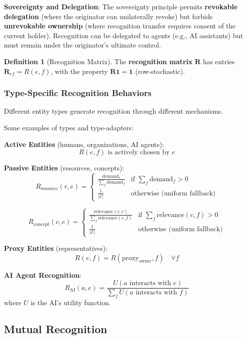 \documentclass[11pt,a4paper]{article}
\theoremstyle{definition}
\newtheorem{definition}[theorem]{Definition}
\theoremstyle{remark}
\newcommand{\E}{\mathcal{E}}
\begin{document}
\textbf{Sovereignty and Delegation}: The sovereignty principle permits \textbf{revokable delegation} (where the originator can unilaterally revoke) but forbids \textbf{unrevokable ownership} (where recognition transfer requires consent of the current holder). Recognition can be delegated to agents (e.g., AI assistants) but must remain under the originator's ultimate control.

\begin{definition}[Recognition Matrix]
The \textbf{recognition matrix} $\mathbf{R}$ has entries $\mathbf{R}_{ef} = R(e,f)$, with the property $\mathbf{R} \mathbf{1} = \mathbf{1}$ (row-stochastic).
\end{definition}

\subsubsection{Type-Specific Recognition Behaviors}

Different entity types generate recognition through different mechanisms. 

Some examples of types and type-adapters:

\textbf{Active Entities} (humans, organizations, AI agents):
\[ R(e,f) \text{ is actively chosen by } e \]

\textbf{Passive Entities} (resources, concepts):
\[ R_{\text{resource}}(r,e) = \begin{cases} 
\frac{\text{demand}_e}{\sum_f \text{demand}_f} & \text{if } \sum_f \text{demand}_f > 0 \\
\frac{1}{|\E|} & \text{otherwise (uniform fallback)}
\end{cases} \]

\[ R_{\text{concept}}(c,e) = \begin{cases}
\frac{\text{relevance}(c,e)}{\sum_f \text{relevance}(c,f)} & \text{if } \sum_f \text{relevance}(c,f) > 0 \\
\frac{1}{|\E|} & \text{otherwise (uniform fallback)}
\end{cases} \]

\textbf{Proxy Entities} (representatives):
\[ R(e,f) = R(\text{proxy}_\text{owner}, f) \quad \forall f \]

\textbf{AI Agent Recognition}:
\[ R_{\text{AI}}(a,e) = \frac{U(a \text{ interacts with } e)}{\sum_f U(a \text{ interacts with } f)} \]
where $U$ is the AI's utility function.

\subsection{Mutual Recognition}
\end{document}
